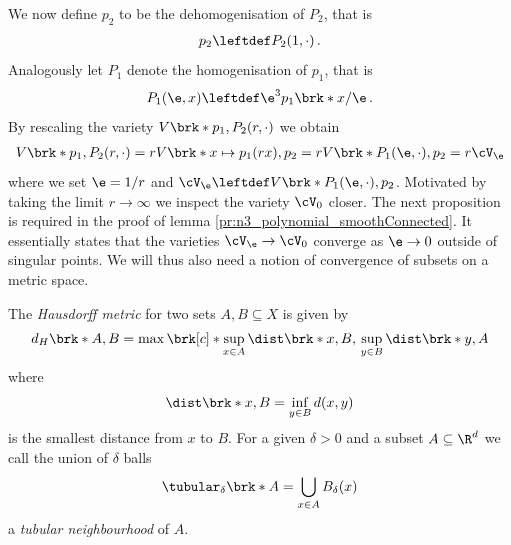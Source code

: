We now define $p_2$ to be the dehomogenisation of $P_2$, that is
\begin{align*}
  p_2\leftdef P_2(1,\cdot)\,.
\end{align*}
Analogously let $P_1$ denote the homogenisation of $p_1$, that is
\begin{align*}
  P_1(\e,x)\leftdef\e^3p_1\brk*{x/\e}\,.
\end{align*}
By rescaling the variety $V\brk*{p_1,P_2(r,\cdot)}$ we obtain
\begin{align}
  V\brk*{p_1,P_2(r,\cdot)}=rV\brk*{x\mapsto p_1(rx),p_2}
  =rV\brk*{P_1(\e,\cdot),p_2}=r\cV_\e\label{eq:n3_polynomial_smoothConnected_relVeps}
\end{align}
where we set $\e=1/r$ and $\cV_\e\leftdef V\brk*{P_1(\e,\cdot),p_2}$. Motivated by taking the limit $r\to\infty$ we
inspect the variety $\cV_0$ closer.
The next proposition is required in the proof of lemma \ref{pr:n3_polynomial_smoothConnected}. It essentially states that the varieties
$\cV_\e\to\cV_0$ converge as $\e\to0$ outside of singular points.
We will thus also need a notion of convergence of subsets on a metric space.
\begin{definition}
  The \emph{Hausdorff metric} for two sets $A,B\subseteq X$ is given by 
  \begin{align}
    d_H\brk*{A,B}=\max\brk[c]*{\sup_{x\in A}\dist\brk*{x,B},\,\sup_{y\in B}\dist\brk*{y,A}}
    \label{eq:def_HausdorffMetric}
  \end{align}
  where
  \begin{align}
    \dist\brk*{x,B}=\inf_{y\in B}d(x,y)\label{eq:def_distance}
  \end{align}
  is the smallest distance from $x$ to $B$.
  For a given $\delta>0$ and a subset $A\subseteq\R^d$ we call the union of $\delta$ balls
  \begin{align}
    \tubular_\delta\brk*{A}=\bigcup_{x\in A}B_\delta(x)\label{eq:def_tubularNbh}
  \end{align}
  a \emph{tubular neighbourhood} of $A$.
\end{definition}

